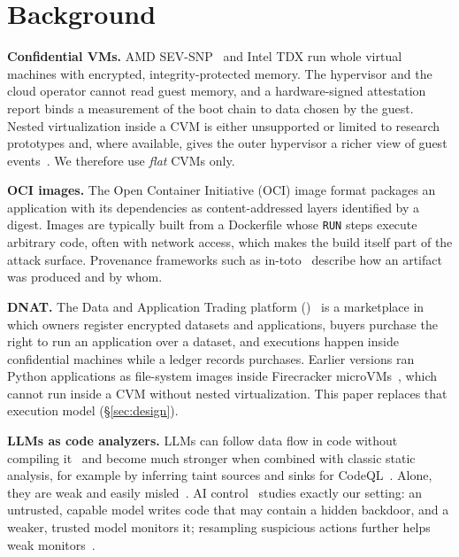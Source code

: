 \section{Background}\label{sec:background}

\textbf{Confidential VMs.} AMD SEV-SNP~\cite{amd2020sevsnp} and Intel TDX run whole virtual
machines with encrypted, integrity-protected memory. The hypervisor and the cloud operator cannot
read guest memory, and a hardware-signed attestation report binds a measurement of the boot chain
to data chosen by the guest. Nested virtualization inside a CVM is either unsupported or limited
to research prototypes and, where available, gives the outer hypervisor a richer view of guest
events~\cite{takiguchi2026nestedsev}. We therefore use \emph{flat} CVMs only.

\textbf{OCI images.} The Open Container Initiative (OCI) image format packages an application
with its dependencies as content-addressed layers identified by a digest. Images are typically
built from a Dockerfile whose \texttt{RUN} steps execute arbitrary code, often with network access,
which makes the build itself part of the attack surface. Provenance frameworks such as
in-toto~\cite{torresarias2019intoto} describe how an artifact was produced and by whom.

\textbf{DNAT.} The Data and Application Trading platform (\sys)~\cite{nascimento2020dnat} is a
marketplace in which owners register encrypted datasets and applications, buyers purchase the
right to run an application over a dataset, and executions happen inside confidential machines
while a ledger records purchases. Earlier versions ran Python applications as file-system images
inside Firecracker microVMs~\cite{agache2020firecracker}, which cannot run inside a CVM without
nested virtualization. This paper replaces that execution model (\S\ref{sec:design}).

\textbf{LLMs as code analyzers.} LLMs can follow data flow in code without compiling
it~\cite{wang2024llmdfa} and become much stronger when combined with classic static analysis,
for example by inferring taint sources and sinks for CodeQL~\cite{li2025iris}. Alone, they are
weak and easily misled~\cite{ding2025primevul}. AI control~\cite{greenblatt2024aicontrol} studies
exactly our setting: an untrusted, capable model writes code that may contain a hidden backdoor,
and a weaker, trusted model monitors it; resampling suspicious actions further helps weak
monitors~\cite{bhatt2025ctrlz}.
